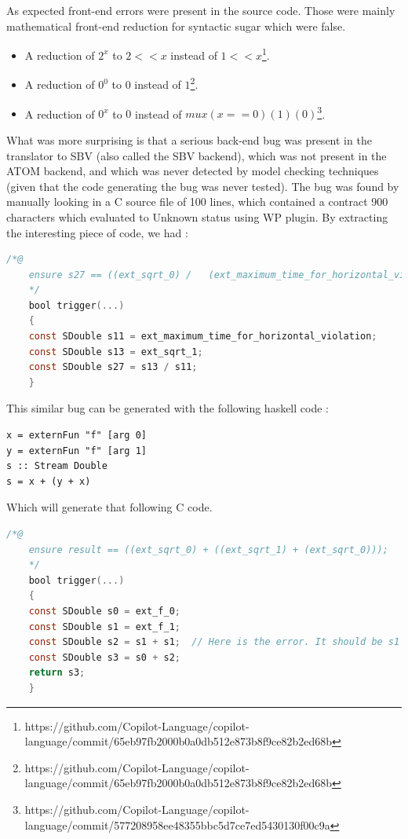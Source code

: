 \documentclass[a4paper,11pt,final]{article}
\begin{document}
	As expected front-end errors were present in the source code. Those were mainly mathematical front-end reduction for syntactic sugar which were false.
	
	\begin{itemize}
		\item A reduction of $2^x$ to $2 << x$ instead of $1 << x$\footnote{https://github.com/Copilot-Language/copilot-language/commit/65eb97fb2000b0a0db512e873b8f9ce82b2ed68b}.
		\item A reduction of $0^0$ to $0$ instead of $1$\footnote{https://github.com/Copilot-Language/copilot-language/commit/65eb97fb2000b0a0db512e873b8f9ce82b2ed68b}.
		\item A reduction of $0^x$ to $0$ instead of $mux (x==0) (1) (0)$\footnote{https://github.com/Copilot-Language/copilot-language/commit/577208958ee48355bbc5d7ce7ed5430130f00c9a}.
	\end{itemize}
	
	What was more surprising is that a serious back-end bug was present in the translator to SBV (also called the SBV backend), which was not present in the ATOM backend, and which was never detected by model checking techniques (given that the code generating the bug was never tested). The bug was found by manually looking in a C source file of 100 lines, which contained a contract 900 characters which evaluated to Unknown status using WP plugin. By extracting the interesting piece of code, we had :
	\begin{lstlisting}[language=C, keywordstyle=\color{blue}]
	/*@
	ensure s27 == ((ext_sqrt_0) /   (ext_maximum_time_for_horizontal_violation));
	*/
	bool trigger(...)
	{
	const SDouble s11 = ext_maximum_time_for_horizontal_violation;
	const SDouble s13 = ext_sqrt_1;
	const SDouble s27 = s13 / s11;
	}  \end{lstlisting}
	This similar bug can be generated with the following haskell code :
\begin{verbatim}
x = externFun "f" [arg 0]
y = externFun "f" [arg 1]
s :: Stream Double
s = x + (y + x)
\end{verbatim}
	Which will generate that following C code.
	\begin{lstlisting}[language=C, keywordstyle=\color{blue}]
	/*@
	ensure result == ((ext_sqrt_0) + ((ext_sqrt_1) + (ext_sqrt_0)));
	*/
	bool trigger(...)
	{
	const SDouble s0 = ext_f_0;
	const SDouble s1 = ext_f_1;
	const SDouble s2 = s1 + s1;  // Here is the error. It should be s1 + s0;
	const SDouble s3 = s0 + s2;
	return s3;
	}  \end{lstlisting}
	
\end{document}
